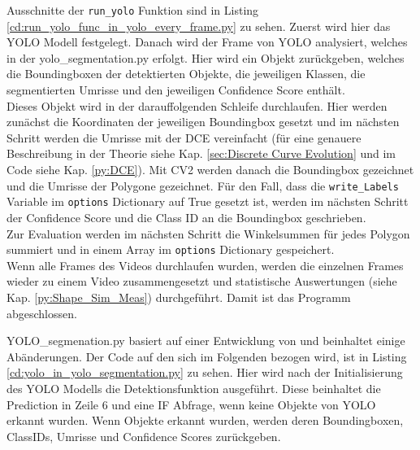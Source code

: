 {	Ausschnitte der \lstinline|run_yolo| Funktion sind in Listing \ref{cd:run_yolo_func_in_yolo_every_frame.py} zu sehen. Zuerst wird hier das YOLO Modell festgelegt. Danach wird der Frame von YOLO analysiert, welches in der yolo\_segmentation.py erfolgt. Hier wird ein Objekt zurückgeben, welches die Boundingboxen der detektierten Objekte, die jeweiligen Klassen, die segmentierten Umrisse und den jeweiligen Confidence Score enthält. \\
	Dieses Objekt wird in der darauffolgenden Schleife durchlaufen. Hier werden zunächst die Koordinaten der jeweiligen Boundingbox gesetzt und im nächsten Schritt werden die Umrisse mit der DCE vereinfacht (für eine genauere Beschreibung in der Theorie siehe Kap. \ref{sec:Discrete Curve Evolution} und im Code siehe Kap. \ref{py:DCE}). Mit CV2 werden danach die Boundingbox gezeichnet und die Umrisse der Polygone gezeichnet. Für den Fall, dass die \lstinline|write_Labels| Variable im \lstinline|options| Dictionary auf True gesetzt ist, werden im nächsten Schritt der Confidence Score und die Class ID an die Boundingbox geschrieben. \\
	Zur Evaluation werden im nächsten Schritt die Winkelsummen für jedes Polygon summiert und in einem Array im  \lstinline|options| Dictionary gespeichert. \\
	Wenn alle Frames des Videos durchlaufen wurden, werden die einzelnen Frames wieder zu einem Video zusammengesetzt und statistische Auswertungen (siehe Kap. \ref{py:Shape_Sim_Meas}) durchgeführt. Damit ist das Programm abgeschlossen.

	
	YOLO\_segmenation.py basiert auf einer Entwicklung von \citeauthor{Canu_pysource} \citep{Canu_pysource} und beinhaltet einige Abänderungen. Der Code auf den sich im Folgenden bezogen wird, ist in Listing \ref{cd:yolo_in_yolo_segmentation.py} zu sehen. Hier wird nach der Initialisierung des YOLO Modells die Detektionsfunktion ausgeführt. Diese beinhaltet die Prediction in Zeile 6 und eine IF Abfrage, wenn keine Objekte von YOLO erkannt wurden. Wenn Objekte erkannt wurden, werden deren Boundingboxen, ClassIDs, Umrisse und Confidence Scores zurückgeben. 

	

	}


